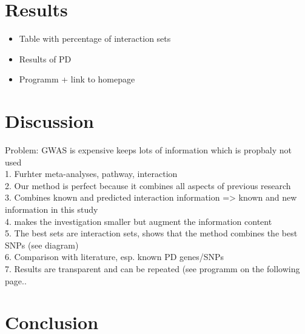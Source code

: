 \documentclass[citeauthoryear]{llncs}
\begin{document}
\section{Results}
%

\begin{itemize}
\item Table with percentage of interaction sets
\item Results of PD
\item Programm + link to homepage
\end{itemize}




\section{Discussion}
%
%
%
%
%
%
%
 Problem: GWAS is expensive keeps lots of information which is propbaly not used\\
 1. Furhter meta-analyses, pathway, interaction\\
 2. Our method is perfect because it combines all aspects of previous research\\
 3. Combines known and predicted interaction information => known and new information in this study\\
 4. makes the investigation smaller but augment the information content\\
 5. The best sets are interaction sets, shows that the method combines the best SNPs (see diagram)\\
 6. Comparison with literature, esp. known PD genes/SNPs\\
 7. Results are transparent and can be repeated (see programm on the following page..\\





\section{Conclusion}
%
%
\end{document}
